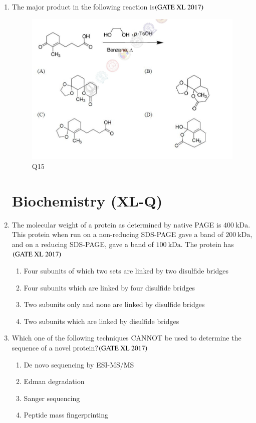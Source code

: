 \documentclass[journal]{IEEEtran}
\begin{document}
\begin{enumerate}
\item The major product in the following reaction is\hfill $\left(\text{GATE XL 2017}\right)$
\begin{figure}[H]
    \centering
    \includegraphics[width=0.85\columnwidth]{figs/xl2017_q15_all_opts.png}
    \caption{Q15}
    \label{fig:placeholder}
\end{figure}

\section*{Biochemistry (XL-Q)}
\setcounter{enumi}{15}

\item The molecular weight of a protein as determined by native PAGE is $400\ \mathrm{kDa}$. This protein when run on a non-reducing SDS-PAGE gave a band of $200\ \mathrm{kDa}$, and on a reducing SDS-PAGE, gave a band of $100\ \mathrm{kDa}$. The protein has\hfill $\left(\text{GATE XL 2017}\right)$
\begin{enumerate}
    \item Four subunits of which two sets are linked by two disulfide bridges
    \item Four subunits which are linked by four disulfide bridges
    \item Two subunits only and none are linked by disulfide bridges
    \item Two subunits which are linked by disulfide bridges
\end{enumerate}

\item Which one of the following techniques CANNOT be used to determine the sequence of a novel protein?\hfill $\left(\text{GATE XL 2017}\right)$
\begin{enumerate}
    \item De novo sequencing by ESI-MS/MS
    \item Edman degradation
    \item Sanger sequencing
    \item Peptide mass fingerprinting
\end{enumerate}


\end{enumerate}
\end{document}
